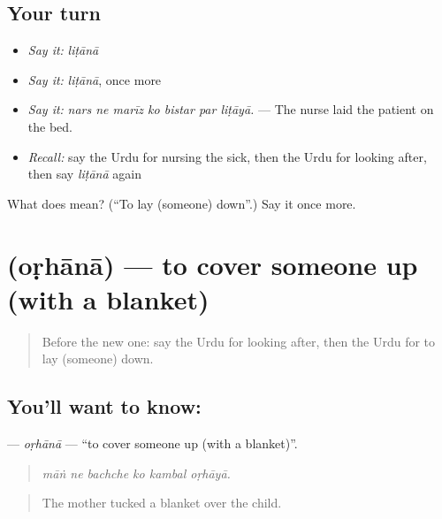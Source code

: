 \subsection*{Your turn}
\begin{itemize}
\raggedright
  \item \emph{Say it:} \emph{liṭānā}
  \item \emph{Say it:} \emph{liṭānā}, once more
  \item \emph{Say it:} \emph{nars ne marīz ko bistar par liṭāyā.} — The nurse laid the patient on the bed.
  \item \emph{Recall:} say the Urdu for nursing the sick, then the Urdu for looking after, then say \emph{liṭānā} again
\end{itemize}

\begin{tcolorbox}[breakable,colback=teal!4,colframe=teal!35!black,title={Before you move on}]
What does  mean? (\textquotedblleft{}To lay (someone) down\textquotedblright{}.) Say it once more.
\end{tcolorbox}
\section[\texorpdfstring{\ur{اوڑھانا} (oṛhānā)}{اوڑھانا (oṛhānā)}]{ (oṛhānā) — to cover someone up (with a blanket)}

\label{lesson:UR-C480-orhana}



\begin{quote}
Before the new one: say the Urdu for looking after, then the Urdu for to lay (someone) down.
\end{quote}

\subsection*{You'll want to know: }
\textbf{} — \emph{oṛhānā} — \textquotedblleft{}to cover someone up (with a blanket)\textquotedblright{}.

\begin{quote}
     
\end{quote}

\begin{quote}
\emph{māṅ ne bachche ko kambal oṛhāyā.}
\end{quote}

\begin{quote}
The mother tucked a blanket over the child.
\end{quote}


